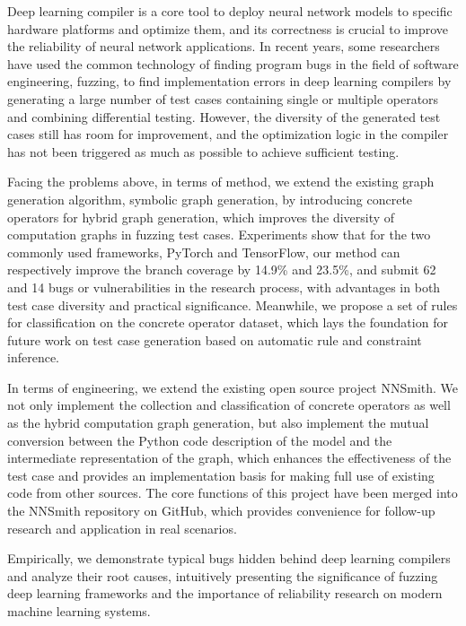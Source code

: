 \begin{abstract*}
Deep learning compiler is a core tool to deploy neural network models to specific hardware platforms and optimize them, and its correctness is crucial to improve the reliability of neural network applications.
In recent years, some researchers have used the common technology of finding program bugs in the field of software engineering, fuzzing, to find implementation errors in deep learning compilers by generating a large number of test cases containing single or multiple operators and combining differential testing. However, the diversity of the generated test cases still has room for improvement, and the optimization logic in the compiler has not been triggered as much as possible to achieve sufficient testing.

Facing the problems above, in terms of method, we extend the existing graph generation algorithm, symbolic graph generation, by introducing concrete operators for hybrid graph generation, which improves the diversity of computation graphs in fuzzing test cases.
Experiments show that for the two commonly used frameworks, PyTorch and TensorFlow, our method can respectively improve the branch coverage by 14.9\% and 23.5\%, and submit 62 and 14 bugs or vulnerabilities in the research process, with advantages in both test case diversity and practical significance.
Meanwhile, we propose a set of rules for classification on the concrete operator dataset, which lays the foundation for future work on test case generation based on automatic rule and constraint inference.

In terms of engineering, we extend the existing open source project NNSmith. We not only implement the collection and classification of concrete operators as well as the hybrid computation graph generation, but also implement the mutual conversion between the Python code description of the model and the intermediate representation of the graph, which enhances the effectiveness of the test case and provides an implementation basis for making full use of existing code from other sources.
The core functions of this project have been merged into the NNSmith repository on GitHub, which provides convenience for follow-up research and application in real scenarios.

Empirically, we demonstrate typical bugs hidden behind deep learning compilers and analyze their root causes, intuitively presenting the significance of fuzzing deep learning frameworks and the importance of reliability research on modern machine learning systems. 

\end{abstract*}
